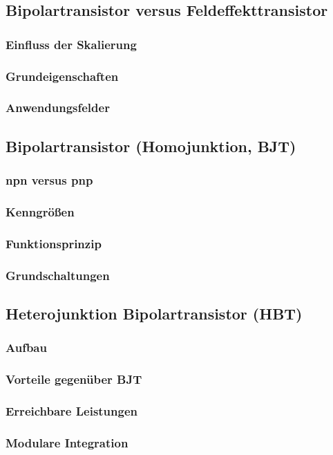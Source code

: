

\subsection{Bipolartransistor versus Feldeffekttransistor}
	\subsubsection{Einfluss der Skalierung}
	\subsubsection{Grundeigenschaften}
	\subsubsection{Anwendungsfelder}
\subsection{Bipolartransistor (Homojunktion, BJT)}
	\subsubsection{npn versus pnp}
	\subsubsection{Kenngrößen}
	\subsubsection{Funktionsprinzip}
	\subsubsection{Grundschaltungen}
\subsection{Heterojunktion Bipolartransistor (HBT)}
	\subsubsection{Aufbau}
	\subsubsection{Vorteile gegenüber BJT}
	\subsubsection{Erreichbare Leistungen}
	\subsubsection{Modulare Integration}


